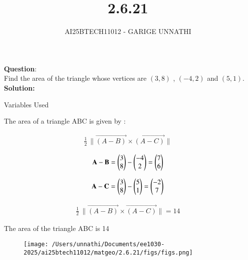 \documentclass[journal]{IEEEtran}
\begin{document}

\vspace{3cm}

\title{2.6.21}
\author{AI25BTECH11012 - GARIGE UNNATHI}
{\let\newpage\relax\maketitle}


\renewcommand{\thefigure}{\theenumi}
\renewcommand{\thetable}{\theenumi}
\setlength{\intextsep}{10pt} %


\renewcommand{\thetable}{\theenumi}


\textbf{Question}:\\
Find the area of the triangle whose vertices are $(3,8)$ , $(-4,2)$ and $(5,1)$.\\
\textbf{Solution: }

 \begin{table}[h!]    
      \centering
      
      \caption{Variables Used}
      \label{}
    \end{table}

The area of a triangle ABC is given by :

\begin{align*}
\frac{1}{2}\,\lVert \vec{(A-B)}\times\vec{(A-C)}\rVert
\end{align*}


\begin{align}
   \mathbf{A}-\mathbf{B} = \begin{pmatrix}3 \\ 8\end{pmatrix} - \begin{pmatrix}-4 \\ 2\end{pmatrix} = \begin{pmatrix}7 \\ 6\end{pmatrix}
\end{align}

\begin{align}
   \mathbf{A}-\mathbf{C} = \begin{pmatrix}3 \\ 8\end{pmatrix} - \begin{pmatrix}5 \\ 1\end{pmatrix} = \begin{pmatrix}-2 \\ 7\end{pmatrix}
\end{align}


\begin{align}
\frac{1}{2}\,\lVert \vec{(A-B)}\times\vec{(A-C)}\rVert = 14
\end{align}

\bigskip
The area of the triangle ABC is 14


\begin{figure}[h!]
   \centering
   \texttt{[image: /Users/unnathi/Documents/ee1030-2025/ai25btech11012/matgeo/2.6.21/figs/figs.png]}
   \caption{}
   \label{stemplot}
\end{figure}
\end{document}
